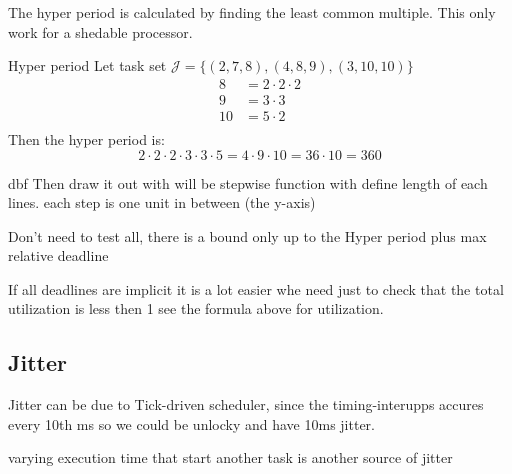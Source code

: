 The hyper period is calculated by finding the least common multiple. 
This only work for a shedable processor.
\begin{exampleblock}{Hyper period}
  Let task set $\mathcal{J}= \{(2,7,8),(4,8,9),(3,10,10)\}$
  \begin{align*}
    8 &= 2\cdot2\cdot2 \\
    9 &= 3\cdot3 \\ 
    10 &= 5\cdot2 \\
  \end{align*}
  Then the hyper period is:
  \begin{equation*}
    2\cdot2\cdot2\cdot3\cdot3\cdot5 = 4\cdot9\cdot10 = 36\cdot10 = 360  
  \end{equation*}
\end{exampleblock}

\begin{exampleblock}{dbf}
  Then draw it out with will be stepwise function with define length of each lines. each step is one unit in between (the y-axis)

  Don't need to test all, there is a bound only up to the Hyper period plus max relative deadline
\end{exampleblock}

If all deadlines are implicit it is a lot easier whe need just to check that the total utilization is less then 1 see the formula above for utilization.



\subsection{Jitter}

Jitter can be due to Tick-driven scheduler, since the timing-interupps accures every 10th ms 
so we could be unlocky and have 10ms jitter.

varying execution time that start another task is another source of jitter

